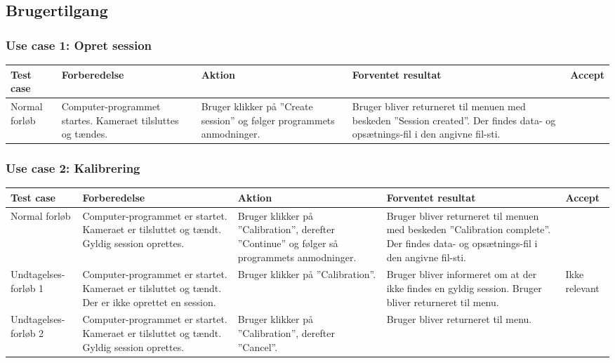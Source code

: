 \documentclass[accepttest.tex]{subfiles}
\begin{document}
\subsection{Brugertilgang}
\subsubsection{Use case 1: Opret session}

\begin{table}[H]
	\small
\begin{tabular}{|p{2cm}|p{3cm}|p{3cm}|p{3cm}|l|}
	\hline Test case & Forberedelse & Aktion & Forventet resultat & Accept \\ 
	\hline Normal forløb & Computer-programmet startes.  Kameraet tilsluttes og tændes.  & Bruger klikker på ”Create session” og følger programmets anmodninger. & Bruger bliver returneret til menuen med beskeden ”Session created”. Der findes data- og opsætnings-fil i den angivne fil-sti. & {\Huge\checkmark} \\ 
	\hline 
\end{tabular} 
\end{table}

\subsubsection{Use case 2: Kalibrering}
\begin{table}[H]
	\small
\begin{tabular}{|p{2cm}|p{3cm}|p{3cm}|p{3cm}|l|}
	\hline Test case & Forberedelse & Aktion & Forventet resultat & Accept \\ 
	\hline Normal forløb & Computer-programmet er startet. Kameraet er tilsluttet og tændt. 
	Gyldig session oprettes. & Bruger klikker på ”Calibration”, derefter ”Continue” og følger så programmets anmodninger. & Bruger bliver returneret til menuen med beskeden ”Calibration complete”. Der findes data- og opsætnings-fil i den angivne fil-sti. & \\
	
	\hline Undtagelses-forløb 1 & Computer-programmet er startet. Kameraet er tilsluttet og tændt. Der er ikke oprettet en session. & Bruger klikker på ”Calibration”. & Bruger bliver informeret om at der ikke findes en gyldig session. Bruger bliver returneret til menu. & Ikke relevant\\
	\hline Undtagelses-forløb 2 & Computer-programmet er startet. Kameraet er tilsluttet og tændt. 
	Gyldig session oprettes. & Bruger klikker på ”Calibration”, derefter ”Cancel”. & Bruger bliver returneret til menu. & {\Huge\checkmark}\\
		\hline 
\end{tabular}
\end{table}
\end{document}
